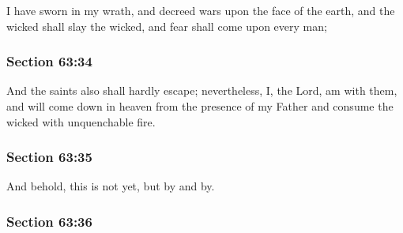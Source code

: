 		I have sworn in my wrath, and decreed wars upon the face of the earth, and the wicked shall slay the wicked, and fear shall come upon every man;


	\subsubsection{Section 63:34} %
		\label{DC63-34}

		And the saints also shall hardly escape; nevertheless, I, the Lord, am with them, and will come down in heaven from the presence of my Father and consume the wicked with unquenchable fire.


	\subsubsection{Section 63:35} %
		\label{DC63-35}

		And behold, this is not yet, but by and by.


	\subsubsection{Section 63:36} %
		\label{DC63-36}

